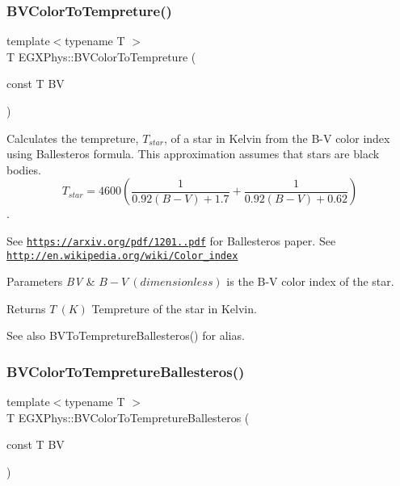 \subsubsection{\texorpdfstring{B\+V\+Color\+To\+Tempreture()}{BVColorToTempreture()}}
{\footnotesize\ttfamily template$<$typename T $>$ \\
T E\+G\+X\+Phys\+::\+B\+V\+Color\+To\+Tempreture (\begin{DoxyParamCaption}\item[{const T}]{BV }\end{DoxyParamCaption})}



Calculates the tempreture, $T_{star}$, of a star in Kelvin from the B-\/V color index using Ballesteros\textquotesingle{} formula. This approximation assumes that stars are black bodies. \[T_{star}=4600 \left ( \frac{1}{0.92 (B-V)+ 1.7} + \frac{1}{0.92 (B-V) + 0.62} \right )\]. 

See \href{https://arxiv.org/pdf/1201.1809.pdf}{\tt https\+://arxiv.\+org/pdf/1201..\+pdf} for Ballesteros\textquotesingle{} paper. See \href{http://en.wikipedia.org/wiki/Color_index}{\tt http\+://en.\+wikipedia.\+org/wiki/\+Color\+\_\+index}


\begin{DoxyParams}{Parameters}
{\em BV} & $B-V\ (dimensionless)$ is the B-\/V color index of the star. \\
\hline
\end{DoxyParams}
\begin{DoxyReturn}{Returns}
$T\ (K)$ Tempreture of the star in Kelvin. 
\end{DoxyReturn}
\begin{DoxySeeAlso}{See also}
B\+V\+To\+Tempreture\+Ballesteros() for alias. 
\end{DoxySeeAlso}
\mbox{\label{group___e_g_x_phys-_astrophysic-_b-_v_color_ga0e553143a3bb121c3ae50ca96c502140}} 
\subsubsection{\texorpdfstring{B\+V\+Color\+To\+Tempreture\+Ballesteros()}{BVColorToTempretureBallesteros()}}
{\footnotesize\ttfamily template$<$typename T $>$ \\
T E\+G\+X\+Phys\+::\+B\+V\+Color\+To\+Tempreture\+Ballesteros (\begin{DoxyParamCaption}\item[{const T}]{BV }\end{DoxyParamCaption})}



